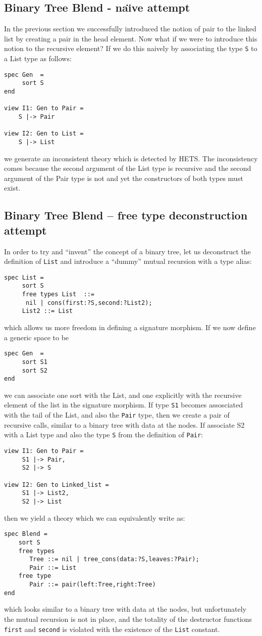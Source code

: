 \documentclass{blue-book}
\begin{document}
\subsection{Binary Tree Blend - na{\"\i}ve attempt}

In the previous section we successfully introduced the notion of pair to the linked list by creating a pair in the head element. Now what if we were to introduce this notion to the recursive element? If we do this naively by associating the type {\tt S} to a List type as follows:
\begin{verbatim}
spec Gen  = 
     sort S
end

view I1: Gen to Pair = 
    S |-> Pair

view I2: Gen to List =
    S |-> List
\end{verbatim}
we generate an inconsistent theory which is detected by HETS. The inconsistency comes because the second argument of the List type is recursive and the second argument of the Pair type is not and yet the constructors of both types must exist.

\subsection{Binary Tree Blend -- free type deconstruction attempt}

In order to try and ``invent'' the concept of a binary tree, let us deconstruct the definition of {\tt List} and introduce a ``dummy'' mutual recursion with a type alias:
\begin{verbatim}
spec List =
     sort S
     free types List  ::=
	  nil | cons(first:?S,second:?List2);
     List2 ::= List
\end{verbatim}
\noindent which allows us more freedom in defining a signature morphism. If we now define a generic space to be
\begin{verbatim}
spec Gen  = 
     sort S1
     sort S2
end
\end{verbatim}
we can associate one sort with the List, and one explicitly with the recursive element of the list in the signature morphism. If type {\tt S1} becomes assosciated with the tail of the List, and also the {\tt Pair} type, then we create a pair of recursive calls, similar to a binary tree with data at the nodes. If associate S2 with a List type and also the type {\tt S} from the definition of {\tt Pair}:
\begin{verbatim}
view I1: Gen to Pair = 
     S1 |-> Pair,
     S2 |-> S

view I2: Gen to Linked_list = 
     S1 |-> List2,
     S2 |-> List
\end{verbatim}
then we yield a theory which we can equivalently write as:
\begin{verbatim}
spec Blend = 
    sort S
    free types
       Tree ::= nil | tree_cons(data:?S,leaves:?Pair);
       Pair ::= List 
    free type
       Pair ::= pair(left:Tree,right:Tree)
end
\end{verbatim}
\noindent which looks similar to a binary tree with data at the nodes,
but unfortunately the mutual recursion is not in place, and the
totality of the destructor functions {\tt first} and {\tt second} is
violated with the existence of the {\tt List} constant. 
\end{document}
